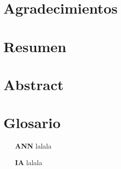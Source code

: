 \section*{Agradecimientos}

\newpage

\section*{Resumen}
 
\newpage

\section*{Abstract}

\newpage

\section*{Glosario}

\begin{itemize}

\item[\textbf{ANN}] lalala

\item[\textbf{IA}] lalala



\end{itemize}
